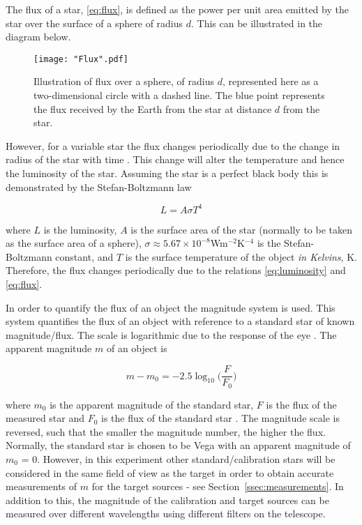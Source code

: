 \documentclass{article}
\newcommand{\secref}[2][Section~]{#1\ref{#2}}
\begin{document}
The flux of a star, \eqref{eq:flux}, is defined as the power per unit area emitted by the star over the surface of a sphere of radius $d$. This can be illustrated in the diagram below.

\vspace{2mm}

\begin{figure}[h]
\centering
\texttt{[image: "Flux".pdf]}
\caption{Illustration of flux over a sphere, of radius $d$, represented here as a two-dimensional circle with a dashed line. The blue point represents the flux received by the Earth from the star at distance $d$ from the star.}
\label{fig:flux-sphere}
\end{figure}


\vspace{2mm}
\noindent
However, for a variable star the flux changes periodically due to the change in radius of the star with time \cite{Paper02}. This change will alter the temperature and hence the luminosity of the star. Assuming the star is a perfect black body this is demonstrated by the Stefan-Boltzmann law

\begin{equation}
\label{eq:luminosity}
L = A\sigma T^4
\end{equation}

\vspace{2mm}
\noindent
where $L$ is the luminosity, $A$ is the surface area of the star (normally to be taken as the surface area of a sphere), $\sigma \approx 5.67 \times 10^{-8}$Wm$^{-2}$K$^{-4}$ is the Stefan-Boltzmann constant, and $T$ is the surface temperature of the object \textit{in Kelvins}, K. Therefore, the flux changes periodically due to the relations \eqref{eq:luminosity} and \eqref{eq:flux}. 

\vspace{2mm}
\noindent
In order to quantify the flux of an object the magnitude system is used. This system quantifies the flux of an object with reference to a standard star of known magnitude/flux. The scale is logarithmic due to the response of the eye \cite{Paper01}. The apparent magnitude $m$ of an object is

\begin{equation}
\label{eq:apparent-magnitude}
m - m_0 = -2.5\log_{10}\bigg(\frac{F}{F_0}\bigg)
\end{equation}

\vspace{2mm}
\noindent
where $m_0$ is the apparent magnitude of the standard star, $F$ is the flux of the measured star and $F_0$ is the flux of the standard star \cite{Paper01}. The magnitude scale is reversed, such that the smaller the magnitude number, the higher the flux. Normally, the standard star is chosen to be Vega with an apparent magnitude of $m_0$ = 0. However, in this experiment other standard/calibration stars will be considered in the same field of view as the target \cite{Paper01} in order to obtain accurate measurements of $m$ for the target sources - see \secref{ssec:measurements}. In addition to this, the magnitude of the calibration and target sources can be measured over different wavelengths using different filters \cite{Paper01} on the telescope.
\end{document}
